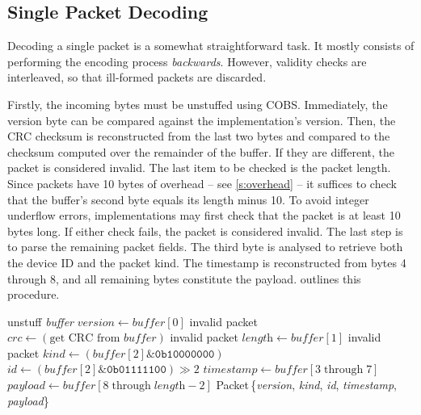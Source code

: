 \documentclass[a4paper,11pt,english]{article}
\def\t#1:#2;{\ensuremath{\textit{#1}}\ :\ #2}
\begin{document}
\subsection[dec:single]{Single Packet Decoding}
Decoding a single packet is a somewhat straightforward task. It mostly consists of performing the encoding process \textit{backwards}. However, validity checks are interleaved, so that ill-formed packets are discarded.

Firstly, the incoming bytes must be unstuffed using COBS. Immediately, the version byte can be compared against the implementation's version. Then, the CRC checksum is reconstructed from the last two bytes and compared to the checksum computed over the remainder of the buffer. If they are different, the packet is considered invalid. The last item to be checked is the packet length. Since packets have 10 bytes of overhead -- see \cref{s:overhead} -- it suffices to check that the buffer's second byte equals its length minus 10. To avoid integer underflow errors, implementations may first check that the packet is at least 10 bytes long. If either check fails, the packet is considered invalid. The last step is to parse the remaining packet fields. The third byte is analysed to retrieve both the device ID and the packet kind. The timestamp is reconstructed from bytes 4 through 8, and all remaining bytes constitute the payload.  outlines this procedure.

\begin{algorithm}[h]
  \caption{Single packet decoding procedure}\label{listing:dec-single}
  \begin{algorithmic}
    \Procedure{decode}{\t buffer:uint8;}
    \State unstuff \textit{buffer}
    \State $\textit{version} \gets \textit{buffer}[0]$
    \State \Return invalid packet
    \EndIf
    \State $\textit{crc} \gets (\textrm{get CRC from }\textit{buffer})$
    \State \Return invalid packet
    \EndIf
    \State $\textit{length} \gets \textit{buffer}[1]$
    \State \Return invalid packet
    \EndIf
    \State $\textit{kind} \gets (\textit{buffer}[2] \mathbin{\&} \texttt{0b10000000})$
    \State $\textit{id} \gets (\textit{buffer}[2] \mathbin{\&} \texttt{0b01111100}) \gg 2$
    \State $\textit{timestamp} \gets \textit{buffer}[3 \mathbin{\textrm{through}} 7]$
    \State $\textit{payload} \gets \textit{buffer}[8 \mathbin{\textrm{through}} \textit{length} - 2]$
    \State \Return Packet\,\{\textit{version}, \textit{kind}, \textit{id}, \textit{timestamp}, \textit{payload}\}
    \EndProcedure
  \end{algorithmic}
\end{algorithm}
\end{document}
